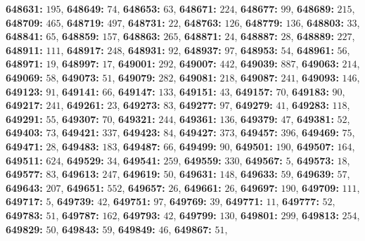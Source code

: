 \textsf{\bfseries 648631:} $195$, \textsf{\bfseries 648649:} $74$, \textsf{\bfseries 648653:} $63$, \textsf{\bfseries 648671:} $224$, \textsf{\bfseries 648677:} $99$, \textsf{\bfseries 648689:} $215$, \textsf{\bfseries 648709:} $465$, \textsf{\bfseries 648719:} $497$, \textsf{\bfseries 648731:} $22$, \textsf{\bfseries 648763:} $126$, \textsf{\bfseries 648779:} $136$, \textsf{\bfseries 648803:} $33$, \textsf{\bfseries 648841:} $65$, \textsf{\bfseries 648859:} $157$, \textsf{\bfseries 648863:} $265$, \textsf{\bfseries 648871:} $24$, \textsf{\bfseries 648887:} $28$, \textsf{\bfseries 648889:} $227$, \textsf{\bfseries 648911:} $111$, \textsf{\bfseries 648917:} $248$, \textsf{\bfseries 648931:} $92$, \textsf{\bfseries 648937:} $97$, \textsf{\bfseries 648953:} $54$, \textsf{\bfseries 648961:} $56$, \textsf{\bfseries 648971:} $19$, \textsf{\bfseries 648997:} $17$, \textsf{\bfseries 649001:} $292$, \textsf{\bfseries 649007:} $442$, \textsf{\bfseries 649039:} $887$, \textsf{\bfseries 649063:} $214$, \textsf{\bfseries 649069:} $58$, \textsf{\bfseries 649073:} $51$, \textsf{\bfseries 649079:} $282$, \textsf{\bfseries 649081:} $218$, \textsf{\bfseries 649087:} $241$, \textsf{\bfseries 649093:} $146$, \textsf{\bfseries 649123:} $91$, \textsf{\bfseries 649141:} $66$, \textsf{\bfseries 649147:} $133$, \textsf{\bfseries 649151:} $43$, \textsf{\bfseries 649157:} $70$, \textsf{\bfseries 649183:} $90$, \textsf{\bfseries 649217:} $241$, \textsf{\bfseries 649261:} $23$, \textsf{\bfseries 649273:} $83$, \textsf{\bfseries 649277:} $97$, \textsf{\bfseries 649279:} $41$, \textsf{\bfseries 649283:} $118$, \textsf{\bfseries 649291:} $55$, \textsf{\bfseries 649307:} $70$, \textsf{\bfseries 649321:} $244$, \textsf{\bfseries 649361:} $136$, \textsf{\bfseries 649379:} $47$, \textsf{\bfseries 649381:} $52$, \textsf{\bfseries 649403:} $73$, \textsf{\bfseries 649421:} $337$, \textsf{\bfseries 649423:} $84$, \textsf{\bfseries 649427:} $373$, \textsf{\bfseries 649457:} $396$, \textsf{\bfseries 649469:} $75$, \textsf{\bfseries 649471:} $28$, \textsf{\bfseries 649483:} $183$, \textsf{\bfseries 649487:} $66$, \textsf{\bfseries 649499:} $90$, \textsf{\bfseries 649501:} $190$, \textsf{\bfseries 649507:} $164$, \textsf{\bfseries 649511:} $624$, \textsf{\bfseries 649529:} $34$, \textsf{\bfseries 649541:} $259$, \textsf{\bfseries 649559:} $330$, \textsf{\bfseries 649567:} $5$, \textsf{\bfseries 649573:} $18$, \textsf{\bfseries 649577:} $83$, \textsf{\bfseries 649613:} $247$, \textsf{\bfseries 649619:} $50$, \textsf{\bfseries 649631:} $148$, \textsf{\bfseries 649633:} $59$, \textsf{\bfseries 649639:} $57$, \textsf{\bfseries 649643:} $207$, \textsf{\bfseries 649651:} $552$, \textsf{\bfseries 649657:} $26$, \textsf{\bfseries 649661:} $26$, \textsf{\bfseries 649697:} $190$, \textsf{\bfseries 649709:} $111$, \textsf{\bfseries 649717:} $5$, \textsf{\bfseries 649739:} $42$, \textsf{\bfseries 649751:} $97$, \textsf{\bfseries 649769:} $39$, \textsf{\bfseries 649771:} $11$, \textsf{\bfseries 649777:} $52$, \textsf{\bfseries 649783:} $51$, \textsf{\bfseries 649787:} $162$, \textsf{\bfseries 649793:} $42$, \textsf{\bfseries 649799:} $130$, \textsf{\bfseries 649801:} $299$, \textsf{\bfseries 649813:} $254$, \textsf{\bfseries 649829:} $50$, \textsf{\bfseries 649843:} $59$, \textsf{\bfseries 649849:} $46$, \textsf{\bfseries 649867:} $51$, 
